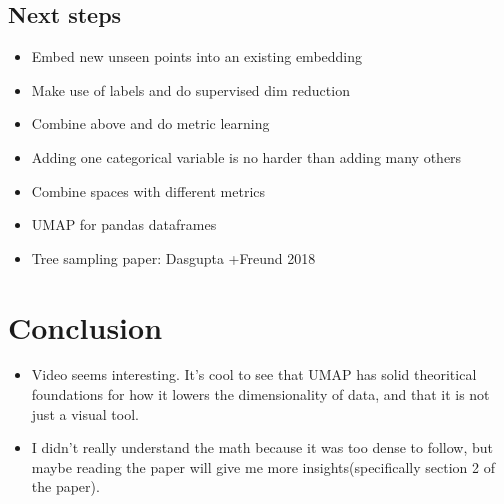 \documentclass[a4paper]{article}
\begin{document}
\subsection{Next steps}
\begin{itemize}
    \item Embed new unseen points into an existing embedding
    \item Make use of labels and do supervised dim reduction
    \item Combine above and do metric learning
    \item Adding one categorical variable is no harder than adding many others
    \item Combine spaces with different metrics
    \item UMAP for pandas dataframes
    \item Tree sampling paper: Dasgupta +Freund 2018
\end{itemize}
\section{Conclusion}
\begin{itemize}
    \item Video seems interesting. It's cool to see that UMAP has solid theoritical foundations for how it lowers the dimensionality of data, and that it is not just a visual tool.
    \item I didn't really understand the math because it was too dense to follow, but maybe reading the paper will give me more insights(specifically section 2 of the paper).
\end{itemize}
\end{document}
